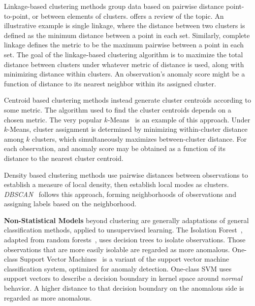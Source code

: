 Linkage-based clustering methods group data based on pairwise distance 
    point-to-point, or between elements of clusters.  \cite{ackerman2010} offers
    a review of the topic.  An illustrative example is single linkage, where 
    the distance between two clusters is defined as the minimum distance 
    between a point in each set.   Similarly, complete linkage defines the 
    metric to be the maximum pairwise between a point in each set.  The goal of 
    the linkage-based clustering algorithm is to maximize the total distance 
    between clusters under whatever metric of distance is used, along with 
    minimizing distance within clusters.  An observation's anomaly score might 
    be a function of distance to its nearest neighbor within its assigned 
    cluster.

Centroid based clustering methods instead generate cluster centroids 
    according to some metric.  The algorithm used to find the cluster centroids 
    depends on a chosen metric.  The very popular $k$-Means~\citep{hartigan1979} 
    is an example of this approach. Under $k$-Means, cluster assignment is 
    determined by minimizing within-cluster distance among $k$ clusters, which 
    simultaneously maximizes between-cluster distance. For each observation, 
    and anomaly score may be obtained as a function of its distance to the 
    nearest cluster centroid.  
    
Density based clustering methods use pairwise distances between observations to 
    establish a measure of local density, then establish local modes as 
    clusters.  \emph{DBSCAN}~\citep{ester1996} follows this approach, forming 
    neighborhoods of observations and assigning labels based on the 
    neighborhood. 
    
{\bf Non-Statistical Models} beyond clustering are generally adaptations 
    of general classification methods, applied to unsupervised learning.  
    The Isolation Forest~\citep{liu2000}, adapted from random 
    forests~\citep{breiman2001}, uses decision trees to isolate observations.
    Those observations that are more easily isolable are regarded as more 
    anomalous.  One-class Support Vector Machines~\citep{chang2011} is a variant
    of the support vector machine classification system, optimized for 
    anomaly detection.  One-class SVM uses support vectors to describe a 
    decision boundary in kernel space around \emph{normal} behavior. A higher 
    distance to that decision boundary on the anomalous side is regarded as 
    more anomalous.
    
